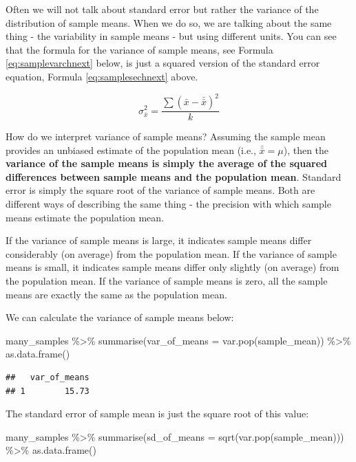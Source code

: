 \documentclass[
]{krantz}
\makeatletter
\newenvironment{Shaded}{\begin{snugshade}}{\end{snugshade}}
\newcommand{\AttributeTok}[1]{\textcolor[rgb]{0.61,0.61,0.61}{#1}}
\newcommand{\FunctionTok}[1]{\textcolor[rgb]{0,0,0}{#1}}
\newcommand{\NormalTok}[1]{#1}
\newcommand{\SpecialCharTok}[1]{\textcolor[rgb]{0,0,0}{#1}}
\newenvironment{kframe}{%
\medskip{}
\setlength{\fboxsep}{.8em}
 \def\at@end@of@kframe{}%
 \ifinner\ifhmode%
  \def\at@end@of@kframe{\end{minipage}}%
  \begin{minipage}{\columnwidth}%
 \fi\fi%
 \def\FrameCommand##1{\hskip\@totalleftmargin \hskip-\fboxsep
 \colorbox{shadecolor}{##1}\hskip-\fboxsep
     \hskip-\linewidth \hskip-\@totalleftmargin \hskip\columnwidth}%
 \MakeFramed {\advance\hsize-\width
   \@totalleftmargin\z@ \linewidth\hsize
   \@setminipage}}%
 {\par\unskip\endMakeFramed%
 \at@end@of@kframe}
\renewenvironment{Shaded}{\begin{kframe}}{\end{kframe}}
\makeatother
\begin{document}
Often we will not talk about standard error but rather the variance of the distribution of sample means. When we do so, we are talking about the same thing - the variability in sample means - but using different units. You can see that the formula for the variance of sample means, see Formula \eqref{eq:samplevarchnext} below, is just a squared version of the standard error equation, Formula \eqref{eq:samplesechnext} above.

\begin{equation} 
\sigma_{\bar{x}}^2 = \frac{\sum{(\bar{x} - \bar{\bar{x}})^2}}{k}
      \label{eq:samplevarchnext}
\end{equation}

How do we interpret variance of sample means? Assuming the sample mean provides an unbiased estimate of the population mean (i.e., \(\bar{\bar{x}} = \mu\)), then the \textbf{variance of the sample means is simply the average of the squared differences between sample means and the population mean}. Standard error is simply the square root of the variance of sample means. Both are different ways of describing the same thing - the precision with which sample means estimate the population mean.

If the variance of sample means is large, it indicates sample means differ considerably (on average) from the population mean. If the variance of sample means is small, it indicates sample means differ only slightly (on average) from the population mean. If the variance of sample means is zero, all the sample means are exactly the same as the population mean.

We can calculate the variance of sample means below:

\begin{Shaded}
\begin{Highlighting}[]
\NormalTok{many\_samples }\SpecialCharTok{\%\textgreater{}\%} 
   \FunctionTok{summarise}\NormalTok{(}\AttributeTok{var\_of\_means =} \FunctionTok{var.pop}\NormalTok{(sample\_mean)) }\SpecialCharTok{\%\textgreater{}\%}
   \FunctionTok{as.data.frame}\NormalTok{()}
\end{Highlighting}
\end{Shaded}

\begin{verbatim}
##   var_of_means
## 1        15.73
\end{verbatim}

The standard error of sample mean is just the square root of this value:

\begin{Shaded}
\begin{Highlighting}[]
\NormalTok{many\_samples }\SpecialCharTok{\%\textgreater{}\%} 
   \FunctionTok{summarise}\NormalTok{(}\AttributeTok{sd\_of\_means =} \FunctionTok{sqrt}\NormalTok{(}\FunctionTok{var.pop}\NormalTok{(sample\_mean))) }\SpecialCharTok{\%\textgreater{}\%}
   \FunctionTok{as.data.frame}\NormalTok{()}
\end{Highlighting}
\end{Shaded}
\end{document}
